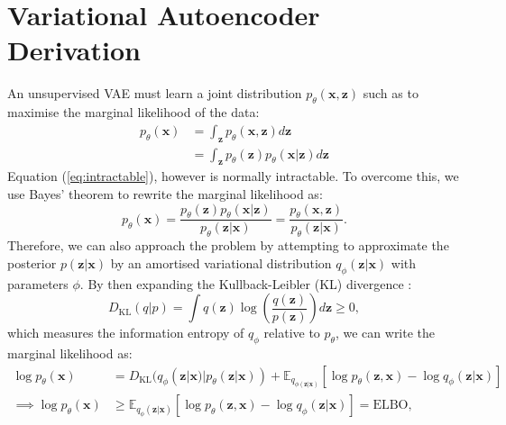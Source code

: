 \section{Variational Autoencoder Derivation}
\label{appendix:vae}
An unsupervised VAE must learn a joint distribution $p_\theta(\boldsymbol{x}, \boldsymbol{z})$ such as to maximise the marginal likelihood of the data:
\begin{align}
    p_\theta(\boldsymbol{x}) &= \int_{\boldsymbol z} p_\theta(\boldsymbol{x}, \boldsymbol{z})d\boldsymbol{z} \\
    & = \int_{\boldsymbol z} p_\theta(\boldsymbol{z}) p_\theta(\boldsymbol{x}|\boldsymbol{z})d\boldsymbol{z} \label{eq:intractable}
\end{align}
Equation (\ref{eq:intractable}), however is normally intractable. To overcome this, we use Bayes' theorem to rewrite the marginal likelihood as:
\begin{equation}
    p_\theta(\boldsymbol{x}) = \frac{p_\theta(\boldsymbol {z})p_\theta(\boldsymbol{x} | \boldsymbol{z})}{p_\theta(\boldsymbol{z}|\boldsymbol{x})}=\frac{p_\theta(\boldsymbol{x}, \boldsymbol{z})}{p_\theta(\boldsymbol{z}|\boldsymbol{x})}.
\end{equation}
Therefore, we can also approach the problem by attempting to approximate the posterior $p(\boldsymbol{z}|\boldsymbol{x})$ by an amortised variational distribution $q_\phi(\boldsymbol{z}|\boldsymbol{x})$ with parameters $\phi$. By then expanding the Kullback-Leibler (KL) divergence \cite{shlens_notes_2014, cui_generalized_2025}: 
\begin{equation}
    D_\text{KL}(q|p)=\int q(\boldsymbol{z})\log\left(\frac{q(\boldsymbol{z})}{p(\boldsymbol{z})}\right)d\boldsymbol{z}\ge 0,
    \label{eq:kl_div}
\end{equation}
which measures the information entropy of $q_\phi$ relative to $p_\theta$, we can write the marginal likelihood as:
\begin{align}
    \log p_\theta(\boldsymbol{x}) &= D_\text{KL}(q_\phi(\boldsymbol{z}|\boldsymbol{x})|p_\theta(\boldsymbol{z}|\boldsymbol{x}))+\mathbb{E}_{q_{\phi(\boldsymbol{z}|\boldsymbol{x})}}[\log p_\theta(\boldsymbol{z},\boldsymbol{x})-\log q_\phi(\boldsymbol{z}|\boldsymbol{x})] \\
    \implies \log p_\theta(\boldsymbol{x}) & \ge \mathbb{E}_{q_\phi(\boldsymbol{z}|\boldsymbol{x})}\left[\log p_\theta(\boldsymbol{z},\boldsymbol{x}) - \log q_\phi(\boldsymbol {z}|\boldsymbol{x})\right]=\text{ELBO},
\end{align}
